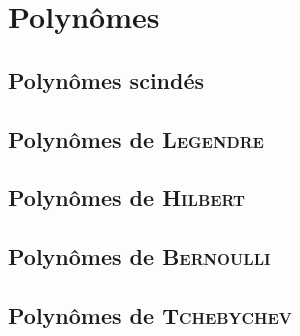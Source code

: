\chapter{Polynômes}

\section{Polynômes scindés}


\section{Polynômes de \textsc{Legendre}}


\section{Polynômes de \textsc{Hilbert}}


\section{Polynômes de \textsc{Bernoulli}}


\section{Polynômes de \textsc{Tchebychev}}


